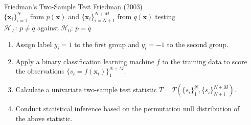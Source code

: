 \documentclass{beamer}
\begin{document}
\begin{frame}{Friedman's Two-Sample Test}
  Friedman (2003) \\
  $\{\mathbf{x}_i\}_{i=1}^N$ from $p(\mathbf{x})$ and
  $\{\mathbf{x}_i\}_{i=N+1}^{N+M}$ from $q(\mathbf{x})$ testing \\
  $\mathcal{H}_A$: $p \neq q$ against $\mathcal{H}_0$: $p = q$ \pause
  \begin{enumerate}
  \item Assign label $y_i = 1$ to the first group and $y_i = -1$ to
    the second group. \pause
  \item Apply a binary classification learning machine $f$ to the training
    data to score the observations $\{s_i = f(\mathbf{x}_i)\}_1^{N+M}$. \pause
  \item Calculate a univariate two-sample test statistic
    $T = T(\{s_i\}_1^N,\{s_i\}_{N+1}^{N+M})$. \pause
  \item Conduct statistical inference based on the permutation null distribution of the above
    statistic.
  \end{enumerate}
\end{frame}
\end{document}
